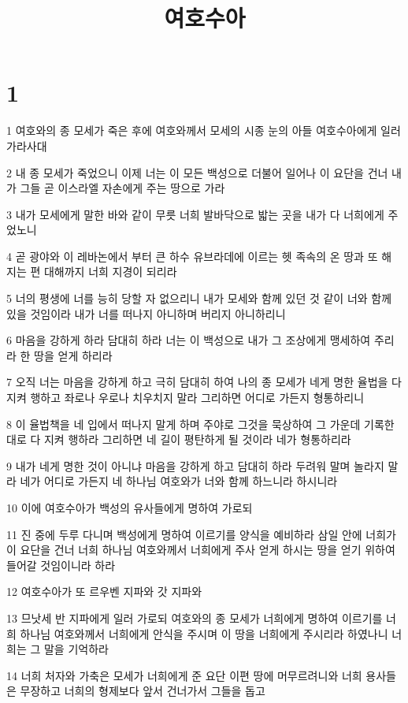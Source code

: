 

\title{여호수아}


\chapter{1}

\par 1 여호와의 종 모세가 죽은 후에 여호와께서 모세의 시종 눈의 아들 여호수아에게 일러 가라사대
\par 2 내 종 모세가 죽었으니 이제 너는 이 모든 백성으로 더불어 일어나 이 요단을 건너 내가 그들 곧 이스라엘 자손에게 주는 땅으로 가라
\par 3 내가 모세에게 말한 바와 같이 무릇 너희 발바닥으로 밟는 곳을 내가 다 너희에게 주었노니
\par 4 곧 광야와 이 레바논에서 부터 큰 하수 유브라데에 이르는 헷 족속의 온 땅과 또 해 지는 편 대해까지 너희 지경이 되리라
\par 5 너의 평생에 너를 능히 당할 자 없으리니 내가 모세와 함께 있던 것 같이 너와 함께 있을 것임이라 내가 너를 떠나지 아니하며 버리지 아니하리니
\par 6 마음을 강하게 하라 담대히 하라 너는 이 백성으로 내가 그 조상에게 맹세하여 주리라 한 땅을 얻게 하리라
\par 7 오직 너는 마음을 강하게 하고 극히 담대히 하여 나의 종 모세가 네게 명한 율법을 다 지켜 행하고 좌로나 우로나 치우치지 말라 그리하면 어디로 가든지 형통하리니
\par 8 이 율법책을 네 입에서 떠나지 말게 하며 주야로 그것을 묵상하여 그 가운데 기록한대로 다 지켜 행하라 그리하면 네 길이 평탄하게 될 것이라 네가 형통하리라
\par 9 내가 네게 명한 것이 아니냐 마음을 강하게 하고 담대히 하라 두려워 말며 놀라지 말라 네가 어디로 가든지 네 하나님 여호와가 너와 함께 하느니라 하시니라
\par 10 이에 여호수아가 백성의 유사들에게 명하여 가로되
\par 11 진 중에 두루 다니며 백성에게 명하여 이르기를 양식을 예비하라 삼일 안에 너희가 이 요단을 건너 너희 하나님 여호와께서 너희에게 주사 얻게 하시는 땅을 얻기 위하여 들어갈 것임이니라 하라
\par 12 여호수아가 또 르우벤 지파와 갓 지파와
\par 13 므낫세 반 지파에게 일러 가로되 여호와의 종 모세가 너희에게 명하여 이르기를 너희 하나님 여호와께서 너희에게 안식을 주시며 이 땅을 너희에게 주시리라 하였나니 너희는 그 말을 기억하라
\par 14 너희 처자와 가축은 모세가 너희에게 준 요단 이편 땅에 머무르려니와 너희 용사들은 무장하고 너희의 형제보다 앞서 건너가서 그들을 돕고
